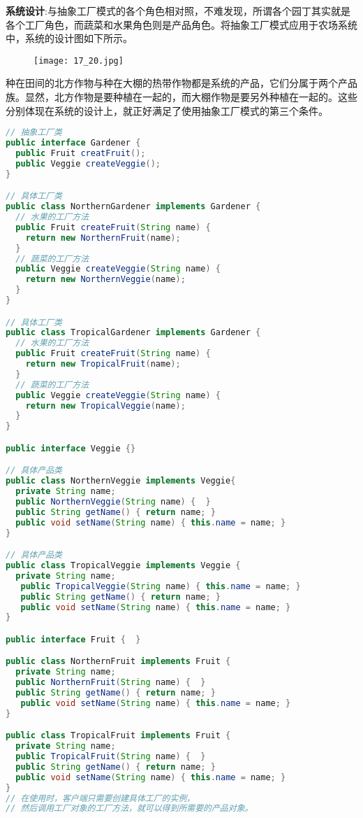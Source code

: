 \documentclass[../main.tex]{subfiles}
\begin{document}
\textbf{系统设计}:与抽象工厂模式的各个角色相对照，不难发现，所谓各个园丁其实就是各个工厂角色，而蔬菜和水果角色则是产品角色。将抽象工厂模式应用于农场系统中，系统的设计图如下所示。
\begin{figure}[H]
  \texttt{[image: 17\_20.jpg]}
\end{figure}
%
种在田间的北方作物与种在大棚的热带作物都是系统的产品，它们分属于两个产品族。显然，北方作物是要种植在一起的，而大棚作物是要另外种植在一起的。这些分别体现在系统的设计上，就正好满足了使用抽象工厂模式的第三个条件。
\begin{lstlisting}[language=java]
// 抽象工厂类
public interface Gardener {
  public Fruit creatFruit();
  public Veggie createVeggie();
}

// 具体工厂类
public class NorthernGardener implements Gardener {
  // 水果的工厂方法
  public Fruit createFruit(String name) {
    return new NorthernFruit(name);
  }
  // 蔬菜的工厂方法
  public Veggie createVeggie(String name) {
    return new NorthernVeggie(name);
  }
}

// 具体工厂类
public class TropicalGardener implements Gardener {
  // 水果的工厂方法
  public Fruit createFruit(String name) {
    return new TropicalFruit(name);
  }
  // 蔬菜的工厂方法
  public Veggie createVeggie(String name) {
    return new TropicalVeggie(name);
  }
}

public interface Veggie {}

// 具体产品类
public class NorthernVeggie implements Veggie{
  private String name;
  public NorthernVeggie(String name) {  }
  public String getName() { return name; }
  public void setName(String name) { this.name = name; }
}

// 具体产品类
public class TropicalVeggie implements Veggie {
  private String name;
   public TropicalVeggie(String name) { this.name = name; }
   public String getName() { return name; }
   public void setName(String name) { this.name = name; }
}

public interface Fruit {  }

public class NorthernFruit implements Fruit {
  private String name;
  public NorthernFruit(String name) {  }
  public String getName() { return name; }
   public void setName(String name) { this.name = name; }
}

public class TropicalFruit implements Fruit {
  private String name;
  public TropicalFruit(String name) {  }
  public String getName() { return name; }
  public void setName(String name) { this.name = name; }
}
// 在使用时，客户端只需要创建具体工厂的实例，
// 然后调用工厂对象的工厂方法，就可以得到所需要的产品对象。
\end{lstlisting}
%
\end{document}
